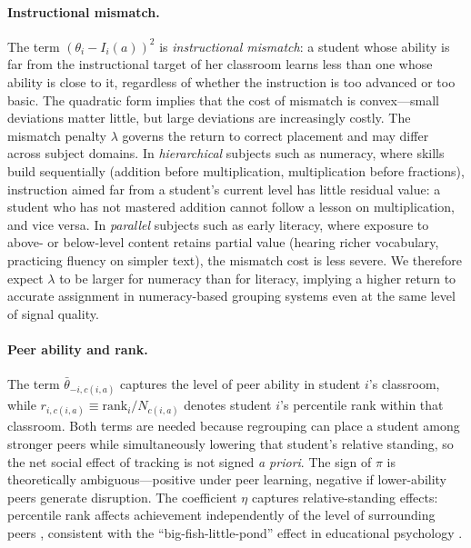 \documentclass[11pt]{article}
\begin{document}
\paragraph{Instructional mismatch.} The term $(\theta_i - I_i(a))^2$ is \emph{instructional mismatch}: a student whose ability is far from the instructional target of her classroom learns less than one whose ability is close to it, regardless of whether the instruction is too advanced or too basic. The quadratic form implies that the cost of mismatch is convex---small deviations matter little, but large deviations are increasingly costly. The mismatch penalty $\lambda$ governs the return to correct placement and may differ across subject domains. In \emph{hierarchical} subjects such as numeracy, where skills build sequentially (addition before multiplication, multiplication before fractions), instruction aimed far from a student's current level has little residual value: a student who has not mastered addition cannot follow a lesson on multiplication, and vice versa. In \emph{parallel} subjects such as early literacy, where exposure to above- or below-level content retains partial value (hearing richer vocabulary, practicing fluency on simpler text), the mismatch cost is less severe. We therefore expect $\lambda$ to be larger for numeracy than for literacy, implying a higher return to accurate assignment in numeracy-based grouping systems even at the same level of signal quality.

\paragraph{Peer ability and rank.} The term $\bar{\theta}_{-i,c(i,a)}$ captures the level of peer ability in student $i$'s classroom, while $r_{i,c(i,a)} \equiv \text{rank}_i / N_{c(i,a)}$ denotes student $i$'s percentile rank within that classroom. Both terms are needed because regrouping can place a student among stronger peers while simultaneously lowering that student's relative standing, so the net social effect of tracking is not signed \emph{a priori}. The sign of $\pi$ is theoretically ambiguous---positive under peer learning, negative if lower-ability peers generate disruption. The coefficient $\eta$ captures relative-standing effects: percentile rank affects achievement independently of the level of surrounding peers \citep{murphy2020top, elsner2021rank}, consistent with the ``big-fish-little-pond'' effect in educational psychology \citep{hoxby2005taking}.
\end{document}
